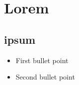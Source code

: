 \section{Lorem}
\lipsum[1-2]

\subsection{ipsum}
\lipsum[1-2]

\begin{itemize}
    \item First bullet point
    \item Second bullet point
\end{itemize}
